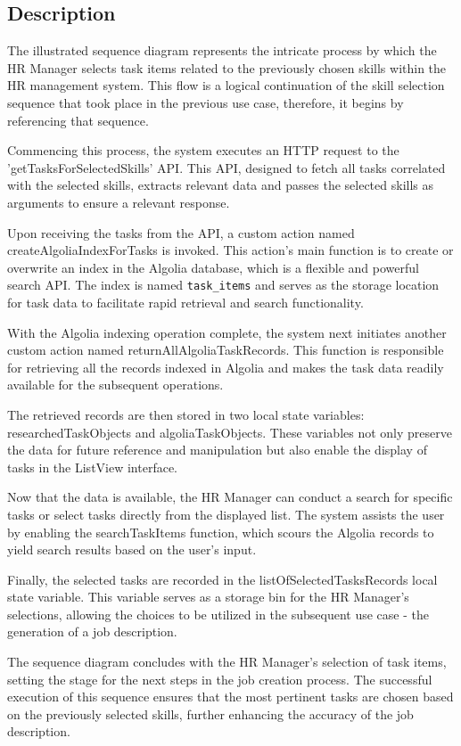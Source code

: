 \newpage
\subsection*{Description}
The illustrated sequence diagram represents the intricate process by which the HR Manager selects task items related to the previously chosen skills within the HR management system. This flow is a logical continuation of the skill selection sequence that took place in the previous use case, therefore, it begins by referencing that sequence.

Commencing this process, the system executes an HTTP request to the 'getTasksForSelectedSkills' API. This API, designed to fetch all tasks correlated with the selected skills, extracts relevant data and passes the selected skills as arguments to ensure a relevant response.

Upon receiving the tasks from the API, a custom action named createAlgoliaIndexForTasks is invoked. This action's main function is to create or overwrite an index in the Algolia database, which is a flexible and powerful search API. The index is named \verb|task_items| and serves as the storage location for task data to facilitate rapid retrieval and search functionality.

With the Algolia indexing operation complete, the system next initiates another custom action named returnAllAlgoliaTaskRecords. This function is responsible for retrieving all the records indexed in Algolia and makes the task data readily available for the subsequent operations.

The retrieved records are then stored in two local state variables: researchedTaskObjects and algoliaTaskObjects. These variables not only preserve the data for future reference and manipulation but also enable the display of tasks in the ListView interface.

Now that the data is available, the HR Manager can conduct a search for specific tasks or select tasks directly from the displayed list. The system assists the user by enabling the searchTaskItems function, which scours the Algolia records to yield search results based on the user's input.

Finally, the selected tasks are recorded in the listOfSelectedTasksRecords local state variable. This variable serves as a storage bin for the HR Manager's selections, allowing the choices to be utilized in the subsequent use case - the generation of a job description.

The sequence diagram concludes with the HR Manager's selection of task items, setting the stage for the next steps in the job creation process. The successful execution of this sequence ensures that the most pertinent tasks are chosen based on the previously selected skills, further enhancing the accuracy of the job description.

